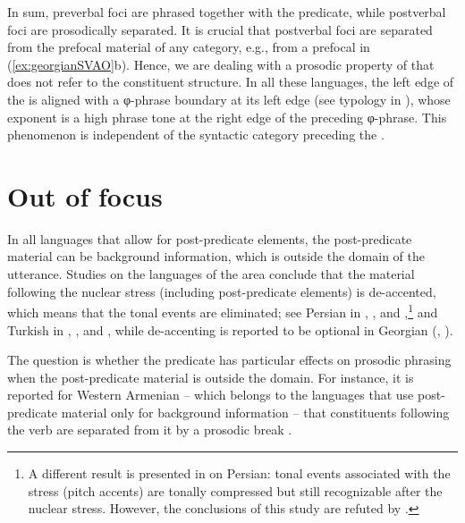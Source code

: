 \documentclass[output=paper,colorlinks,citecolor=brown]{langscibook}
\begin{document}
In sum, preverbal foci are phrased together with the predicate, while postverbal foci are prosodically separated. It is crucial that postverbal foci are separated from the prefocal material of any category, e.g., from a prefocal  in (\ref{ex:georgianSVAO}b). Hence, we are dealing with a prosodic property of  that does not refer to the constituent structure. In all these languages, the left edge of the  is aligned with a φ-phrase boundary at its left edge (see typology in \citealt[]{fery_focus_2013}{}), whose exponent is a high phrase tone at the right edge of the preceding φ-phrase. This phenomenon is independent of the syntactic category preceding the .

\section{Out of focus} \label{sec:out}

In all languages that allow for post-predicate elements, the post-predicate material can be background information, which is outside the  domain of the utterance. Studies on the languages of the area conclude that the material following the nuclear stress (including post-predicate elements) is de-accented, which means that the tonal events are eliminated; see Persian in \citet[]{taheri_ardali_phonetic_2012}{}, \citet[7]{sadat-tehrani_intonational_2007}{}, and \citet[]{rahmani_post-focal_2018}{},\footnote{A different result is presented in \citet[]{abolhasanizadeh_persian_2012}{} on Persian: tonal events associated with the stress (pitch accents) are tonally compressed but still recognizable after the nuclear stress. However, the conclusions of this study are refuted by \citet[]{rahmani_post-focal_2018}{}.} and Turkish in \citet[]{ipek_phonetic_2011}{}, \citet[144]{ozge_intonation_2010}{}, and \citet[34]{kamali_topics_2011}{}, while  de-accenting is reported to be optional in Georgian (\citealt[115]{skopeteas_word_2009}{}, \citealt[177]{vicenik_autosegmental-metrical_2014}{}).

The question is whether the predicate has particular effects on prosodic phrasing when the post-predicate material is outside the  domain. For instance, it is reported for Western Armenian -- which belongs to the languages that use post-predicate material only for background information -- that constituents following the verb are separated from it by a prosodic break \citep[§2.7]{donabedian-demopoulos_middle_2018}. 
\end{document}
